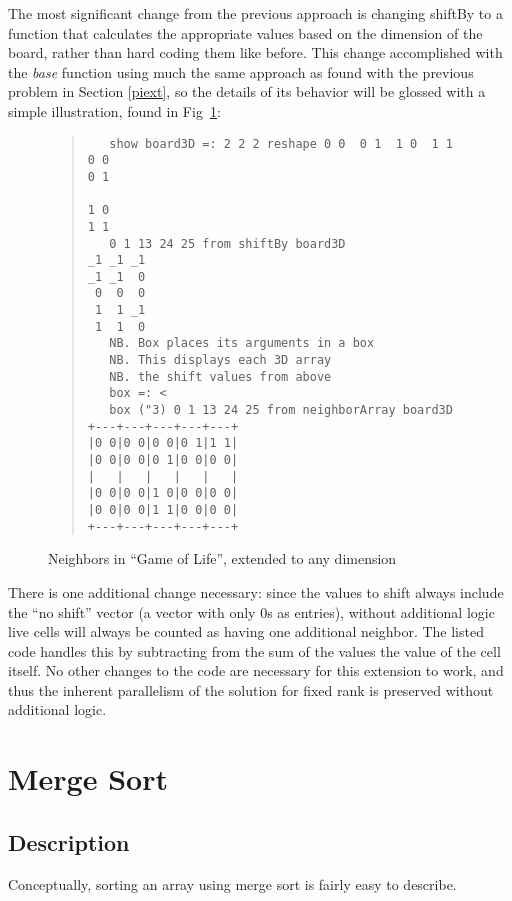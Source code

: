 The most significant change from the previous approach 
is changing \ttfamily shiftBy \normalfont to a function 
that calculates the appropriate values based on the dimension of the board, 
rather than hard coding them like before.
This change accomplished with the \textit{base} function using much the same approach 
as found with the previous problem in Section \ref{piext}, 
so the details of its behavior will be glossed with a simple illustration, 
found in Fig~\ref{fig::gol_ext}:

\begin{figure}
\begin{quote}
\begin{singlespacing}
\begin{small}
\begin{verbatim}
   show board3D =: 2 2 2 reshape 0 0  0 1  1 0  1 1
0 0
0 1

1 0
1 1
   0 1 13 24 25 from shiftBy board3D
_1 _1 _1
_1 _1  0
 0  0  0
 1  1 _1
 1  1  0
   NB. Box places its arguments in a box
   NB. This displays each 3D array
   NB. the shift values from above
   box =: <
   box ("3) 0 1 13 24 25 from neighborArray board3D
+---+---+---+---+---+
|0 0|0 0|0 0|0 1|1 1|
|0 0|0 0|0 1|0 0|0 0|
|   |   |   |   |   |
|0 0|0 0|1 0|0 0|0 0|
|0 0|0 0|1 1|0 0|0 0|
+---+---+---+---+---+
\end{verbatim}
\end{small}
\end{singlespacing}
\end{quote}
\caption{Neighbors in ``Game of Life'', extended to any dimension}
\label{fig::gol_ext}
\end{figure}

There is one additional change necessary:
since the values to shift always include the ``no shift'' vector
(a vector with only 0s as entries),
without additional logic live cells will always be counted as 
having one additional neighbor. 
The listed code handles this by subtracting from 
the sum of the values the value of the cell itself.
No other changes to the code are necessary for this extension to work, 
and thus the inherent parallelism of the solution for fixed rank 
is preserved without additional logic.

\section{Merge Sort}
\label{mgdes}
\subsection{Description}
Conceptually, sorting an array using merge sort is fairly easy to describe.

